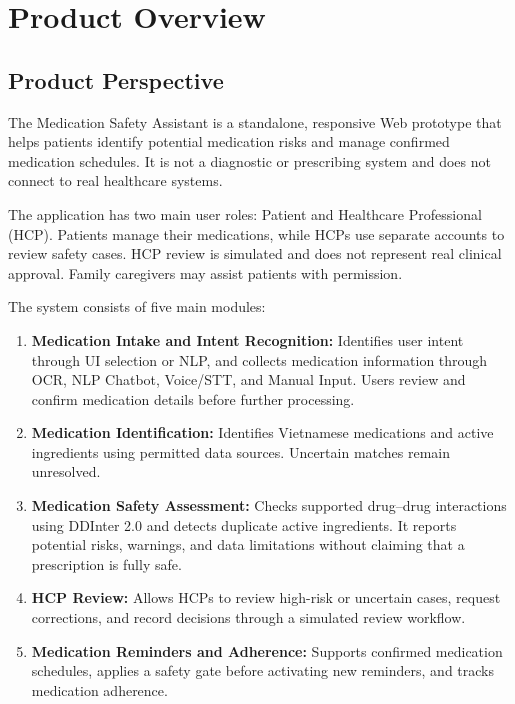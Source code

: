 \section{Product Overview}

\subsection{Product Perspective}

The Medication Safety Assistant is a standalone,
responsive Web prototype that helps patients identify
potential medication risks and manage confirmed
medication schedules. It is not a diagnostic or
prescribing system and does not connect to real
healthcare systems.

The application has two main user roles: Patient
and Healthcare Professional (HCP). Patients manage
their medications, while HCPs use separate accounts
to review safety cases. HCP review is simulated
and does not represent real clinical approval.
Family caregivers may assist patients with permission.

The system consists of five main modules:

\begin{enumerate}
  
    \item \textbf{Medication Intake and Intent Recognition:}
    Identifies user intent through UI selection or
    NLP, and collects medication information
    through OCR, NLP Chatbot, Voice/STT, and
    Manual Input. Users review and confirm
    medication details before further processing.

    \item \textbf{Medication Identification:}
    Identifies Vietnamese medications and active
    ingredients using permitted data sources.
    Uncertain matches remain unresolved.

    \item \textbf{Medication Safety Assessment:}
    Checks supported drug--drug interactions using
    DDInter 2.0 and detects duplicate active
    ingredients. It reports potential risks,
    warnings, and data limitations without
    claiming that a prescription is fully safe.

    \item \textbf{HCP Review:}
    Allows HCPs to review high-risk or uncertain
    cases, request corrections, and record decisions
    through a simulated review workflow.

    \item \textbf{Medication Reminders and Adherence:}
    Supports confirmed medication schedules,
    applies a safety gate before activating new
    reminders, and tracks medication adherence.

\end{enumerate}

